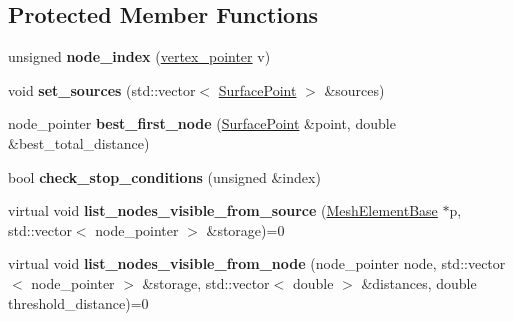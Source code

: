 \subsection*{Protected Member Functions}
\begin{DoxyCompactItemize}
\item 
\hypertarget{classgeodesic_1_1_geodesic_algorithm_graph_base_ad07e47e87272d4d7a754da85b232d94f}{}unsigned {\bfseries node\+\_\+index} (\hyperlink{classgeodesic_1_1_vertex}{vertex\+\_\+pointer} v)\label{classgeodesic_1_1_geodesic_algorithm_graph_base_ad07e47e87272d4d7a754da85b232d94f}

\item 
\hypertarget{classgeodesic_1_1_geodesic_algorithm_graph_base_a63974d998001f79edd6e157cceffe977}{}void {\bfseries set\+\_\+sources} (std\+::vector$<$ \hyperlink{classgeodesic_1_1_surface_point}{Surface\+Point} $>$ \&sources)\label{classgeodesic_1_1_geodesic_algorithm_graph_base_a63974d998001f79edd6e157cceffe977}

\item 
\hypertarget{classgeodesic_1_1_geodesic_algorithm_graph_base_a4a0ce4a71cecefd2005173da1c5065a3}{}node\+\_\+pointer {\bfseries best\+\_\+first\+\_\+node} (\hyperlink{classgeodesic_1_1_surface_point}{Surface\+Point} \&point, double \&best\+\_\+total\+\_\+distance)\label{classgeodesic_1_1_geodesic_algorithm_graph_base_a4a0ce4a71cecefd2005173da1c5065a3}

\item 
\hypertarget{classgeodesic_1_1_geodesic_algorithm_graph_base_a74c976177590a38dc876fb9ac0a037b2}{}bool {\bfseries check\+\_\+stop\+\_\+conditions} (unsigned \&index)\label{classgeodesic_1_1_geodesic_algorithm_graph_base_a74c976177590a38dc876fb9ac0a037b2}

\item 
\hypertarget{classgeodesic_1_1_geodesic_algorithm_graph_base_ab3898bf1b1c480ecb93e9ecdbb4ae0b8}{}virtual void {\bfseries list\+\_\+nodes\+\_\+visible\+\_\+from\+\_\+source} (\hyperlink{classgeodesic_1_1_mesh_element_base}{Mesh\+Element\+Base} $\ast$p, std\+::vector$<$ node\+\_\+pointer $>$ \&storage)=0\label{classgeodesic_1_1_geodesic_algorithm_graph_base_ab3898bf1b1c480ecb93e9ecdbb4ae0b8}

\item 
\hypertarget{classgeodesic_1_1_geodesic_algorithm_graph_base_a86446e8b1c9938016119ccd794be4882}{}virtual void {\bfseries list\+\_\+nodes\+\_\+visible\+\_\+from\+\_\+node} (node\+\_\+pointer node, std\+::vector$<$ node\+\_\+pointer $>$ \&storage, std\+::vector$<$ double $>$ \&distances, double threshold\+\_\+distance)=0\label{classgeodesic_1_1_geodesic_algorithm_graph_base_a86446e8b1c9938016119ccd794be4882}

\end{DoxyCompactItemize}
